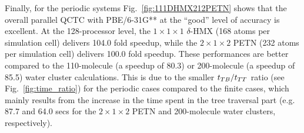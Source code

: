 \commentoutA{\documentclass[prl,aps,twocolumn,twocolumngrid,superbib]{revtex4}}
\begin{document}

Finally, for the periodic systems Fig.~\ref{fig:111DHMX212PETN} shows
that the overall parallel QCTC with PBE/6-31G** at the ``good'' level
of accuracy is excellent. At the 128-processor level, the $1\times
1\times 1$ $\delta$-HMX (168 atoms per simulation cell) delivers 104.0
fold speedup, while the $2\times 1 \times 2$ PETN (232 atoms per
simulation cell) delivers 100.0 fold speedup. These performances are
better compared to the 110-molecule (a speedup of 80.3) or
200-molecule (a speedup of 85.5) water cluster calculations. This is
due to the smaller $t_{TB}/t_{TT}$ ratio (see Fig.~\ref{fig:time_ratio})
for the periodic cases compared to the finite cases, which mainly
results from the increase in the time spent in the tree traversal part
(e.g. 87.7 and 64.0 secs for the $2\times 1 \times 2$ PETN and 200-molecule
water clusters, respectively).
\end{document}
